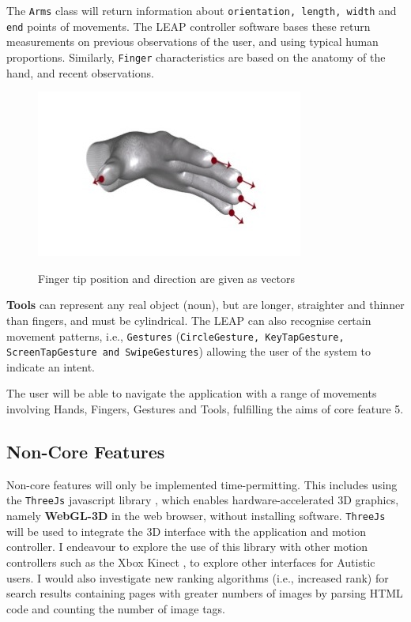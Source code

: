 \documentclass[a4paper, 11pt]{article}
\begin{document}
\begin{justify}
The \texttt{Arms} class will return information about \texttt{orientation, length, width} and \texttt{end} points of movements. The LEAP controller software bases these return measurements on previous observations of the user, and using typical human proportions. Similarly, \texttt{Finger} characteristics are based on the anatomy of the hand, and recent observations. 

\begin{figure}[H]
\begin{center}
\includegraphics[scale=0.4]{fingers}\\
\caption{Finger tip position and direction are given as vectors \cite{leap}}
\end{center}
\end{figure}

\textbf{Tools} can represent any real object (noun), but are longer, straighter and thinner than fingers, and must be cylindrical. The LEAP can also recognise certain movement patterns, i.e., \texttt{Gestures} (\texttt{CircleGesture, KeyTapGesture, ScreenTapGesture and SwipeGestures}) allowing the user of the system to indicate an intent.

The user will be able to navigate the application with a range of movements involving Hands, Fingers, Gestures and Tools, fulfilling the aims of core feature 5.

\subsection{Non-Core Features}
Non-core features will only be implemented time-permitting. This includes using the \texttt{ThreeJs} javascript library \cite{threejs, javascript}, which enables hardware-accelerated 3D graphics, namely \textbf{WebGL-3D} in the web browser, without installing software. \texttt{ThreeJs} will be used to integrate the 3D interface with the application and motion controller. I endeavour to explore the use of this library with other motion controllers such as the Xbox Kinect \cite{kinect}, to explore other interfaces for Autistic users. I would also investigate new ranking algorithms (i.e., increased rank) for search results containing pages with greater numbers of images by parsing HTML code and counting the number of image tags.



\end{justify}
\end{document}
